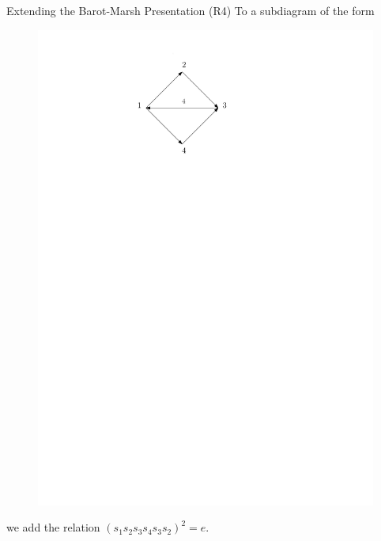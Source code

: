 \documentclass{beamer}
\begin{document}
\begin{frame}{Extending the Barot-Marsh Presentation}
(R4) To a subdiagram of the form
\begin{figure}
\includegraphics[scale = .50]{Diagram1.pdf}
\end{figure}
we add the relation $(s_{1}s_{2}s_{3}s_{4}s_{3}s_{2})^{2} = e$.
\end{frame}
\end{document}
